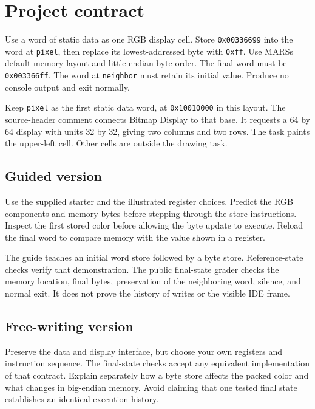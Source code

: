 \section{Project contract}\label{002-single-pixel-assignment-paint-one-cell-and-change-its-blue-component}

Use a word of static data as one RGB display cell. Store
\texttt{0x00336699} into the word at \texttt{pixel}, then replace its
lowest-addressed byte with \texttt{0xff}. Use MARS\textquotesingle s
default memory layout and little-endian byte order. The final word must
be \texttt{0x003366ff}. The word at \texttt{neighbor} must retain its
initial value. Produce no console output and exit normally.

Keep \texttt{pixel} as the first static data word, at
\texttt{0x10010000} in this layout. The source-header comment connects
Bitmap Display to that base. It requests a 64 by 64 display with units
32 by 32, giving two columns and two rows. The task paints the
upper-left cell. Other cells are outside the drawing task.

\subsection{Guided
  version}\label{002-single-pixel-assignment-guided-version}

Use the supplied starter and the illustrated register choices. Predict
the RGB components and memory bytes before stepping through the store
instructions. Inspect the first stored color before allowing the byte
update to execute. Reload the final word to compare memory with the
value shown in a register.

The guide teaches an initial word store followed by a byte store.
Reference-state checks verify that demonstration. The public final-state
grader checks the memory location, final bytes, preservation of the
neighboring word, silence, and normal exit. It does not prove the
history of writes or the visible IDE frame.

\subsection{Free-writing
  version}\label{002-single-pixel-assignment-free-writing-version}

Preserve the data and display interface, but choose your own registers
and instruction sequence. The final-state checks accept any equivalent
implementation of that contract. Explain separately how a byte store
affects the packed color and what changes in big-endian memory. Avoid
claiming that one tested final state establishes an identical execution
history.

